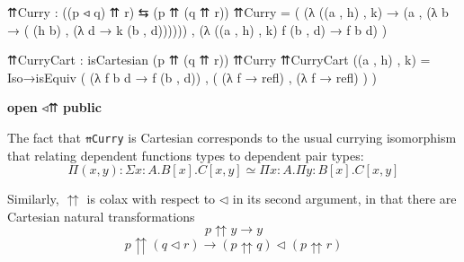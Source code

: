 \documentclass[
  11pt,
  oneside,
  article]{memoir}
\newenvironment{Shaded}{}{}
\newcommand{\KeywordTok}[1]{\textcolor[rgb]{0.00,0.44,0.13}{\textbf{#1}}}
\newcommand{\NormalTok}[1]{#1}
\newcommand{\OtherTok}[1]{\textcolor[rgb]{0.00,0.44,0.13}{#1}}
\theoremstyle{definition}
\theoremstyle{plain}
\newcommand{\0}{\textsf{0}}
\newcommand{\1}{\tn{\textsf{1}}}
\begin{document}
\begin{Shaded}
\begin{Highlighting}[]
\NormalTok{    ⇈Curry }\OtherTok{:} \OtherTok{((}\NormalTok{p ◃ q}\OtherTok{)}\NormalTok{ ⇈ r}\OtherTok{)}\NormalTok{ ⇆ }\OtherTok{(}\NormalTok{p ⇈ }\OtherTok{(}\NormalTok{q ⇈ r}\OtherTok{))}
\NormalTok{    ⇈Curry }\OtherTok{=} \OtherTok{(} \OtherTok{(λ} \OtherTok{((}\NormalTok{a , h}\OtherTok{)}\NormalTok{ , k}\OtherTok{)} 
                  \OtherTok{→} \OtherTok{(}\NormalTok{a , }\OtherTok{(λ}\NormalTok{ b }\OtherTok{→} \OtherTok{(} \OtherTok{(}\NormalTok{h b}\OtherTok{)} 
\NormalTok{                                , }\OtherTok{(λ}\NormalTok{ d }\OtherTok{→}\NormalTok{ k }\OtherTok{(}\NormalTok{b , d}\OtherTok{))))))}
\NormalTok{             , }\OtherTok{(λ} \OtherTok{((}\NormalTok{a , h}\OtherTok{)}\NormalTok{ , k}\OtherTok{)}\NormalTok{ f }\OtherTok{(}\NormalTok{b , d}\OtherTok{)} \OtherTok{→}\NormalTok{ f b d}\OtherTok{)} \OtherTok{)}
    
\NormalTok{    ⇈CurryCart }\OtherTok{:}\NormalTok{ isCartesian }\OtherTok{(}\NormalTok{p ⇈ }\OtherTok{(}\NormalTok{q ⇈ r}\OtherTok{))}\NormalTok{ ⇈Curry}
\NormalTok{    ⇈CurryCart }\OtherTok{((}\NormalTok{a , h}\OtherTok{)}\NormalTok{ , k}\OtherTok{)} \OtherTok{=} 
\NormalTok{        Iso→isEquiv }\OtherTok{(} \OtherTok{(λ}\NormalTok{ f b d }\OtherTok{→}\NormalTok{ f }\OtherTok{(}\NormalTok{b , d}\OtherTok{))} 
\NormalTok{                    , }\OtherTok{(} \OtherTok{(λ}\NormalTok{ f }\OtherTok{→}\NormalTok{ refl}\OtherTok{)}
\NormalTok{                      , }\OtherTok{(λ}\NormalTok{ f }\OtherTok{→}\NormalTok{ refl}\OtherTok{)} \OtherTok{)} \OtherTok{)}

\KeywordTok{open}\NormalTok{ ◃⇈ }\KeywordTok{public}
\end{Highlighting}
\end{Shaded}

The fact that \texttt{⇈Curry} is Cartesian corresponds to the usual
currying isomorphism that relating dependent functions types to
dependent pair types: \[
\Pi (x , y) : \Sigma x : A . B[x] . C[x,y] \simeq \Pi x : A . \Pi y : B[x] . C[x,y]
\]

Similarly, \(\upuparrows\) is colax with respect to \(\triangleleft\) in
its second argument, in that there are Cartesian natural transformations
\[
p \upuparrows y \to y
\] \[
p \upuparrows (q \triangleleft r) \to (p \upuparrows q) \triangleleft (p \upuparrows r)
\]
\end{document}
